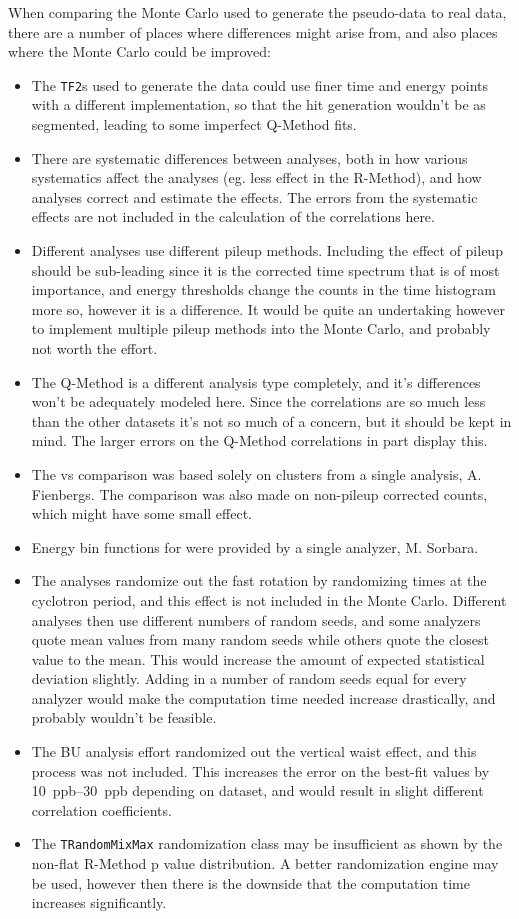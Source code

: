 When comparing the Monte Carlo used to generate the pseudo-data to real data, there are a number of places where differences might arise from, and also places where the Monte Carlo could be improved:
\begin{itemize}
	\item{The \ROOT \texttt{TF2}s used to generate the data could use finer time and energy points with a different implementation, so that the hit generation wouldn't be as segmented, leading to some imperfect Q-Method fits.}
	\item{There are systematic differences between analyses, both in how various systematics affect the analyses (eg. less effect in the R-Method), and how analyses correct and estimate the effects. The errors from the systematic effects are not included in the calculation of the correlations here.}
	\item{Different analyses use different pileup methods. Including the effect of pileup should be sub-leading since it is the corrected time spectrum that is of most importance, and energy thresholds change the counts in the time histogram more so, however it is a difference. It would be quite an undertaking however to implement multiple pileup methods into the Monte Carlo, and probably not worth the effort.}
	\item{The Q-Method is a different analysis type completely, and it's differences won't be adequately modeled here. Since the correlations are so much less than the other datasets it's not so much of a concern, but it should be kept in mind. The larger errors on the Q-Method correlations in part display this.}
	\item{The \RE vs \RW comparison was based solely on clusters from a single \RW analysis, A. Fienbergs. The comparison was also made on non-pileup corrected counts, which might have some small effect.}
	\item{Energy bin functions for \RW were provided by a single \RW analyzer, M. Sorbara.}
	\item{The analyses randomize out the fast rotation by randomizing times at the cyclotron period, and this effect is not included in the Monte Carlo. Different analyses then use different numbers of random seeds, and some analyzers quote mean \R values from many random seeds while others quote the closest \R value to the mean. This would increase the amount of expected statistical deviation slightly. Adding in a number of random seeds equal for every analyzer would make the computation time needed increase drastically, and probably wouldn't be feasible.}
	\item{The BU analysis effort randomized out the vertical waist effect, and this process was not included. This increases the error on the best-fit \R values by \SIrange{10}{30}{ppb} depending on dataset, and would result in slight different correlation coefficients.}
	\item{The \texttt{TRandomMixMax} randomization class may be insufficient as shown by the non-flat R-Method p value distribution. A better randomization engine may be used, however then there is the downside that the computation time increases significantly.}
\end{itemize}




